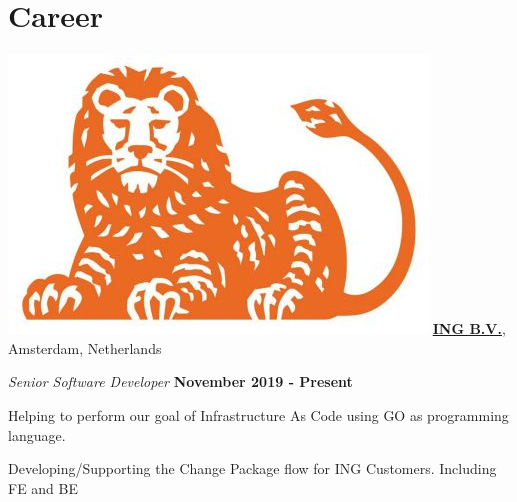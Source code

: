 \section{Career}
%
\includegraphics[scale=0.1]{companies/ing} \href{https://www.ing.nl/}{\textbf{ING B.V.}},
Amsterdam, Netherlands
\begin{outerlist}
        \item[] \textit{Senior Software Developer}%
        \hfill \textbf{November 2019 - Present}

        \begin{innerlist}
                \item Helping to perform our goal of Infrastructure As Code using GO as programming language.

                \item Developing/Supporting the Change Package flow for ING Customers.
                Including FE and BE

        \end{innerlist}

\end{outerlist}


